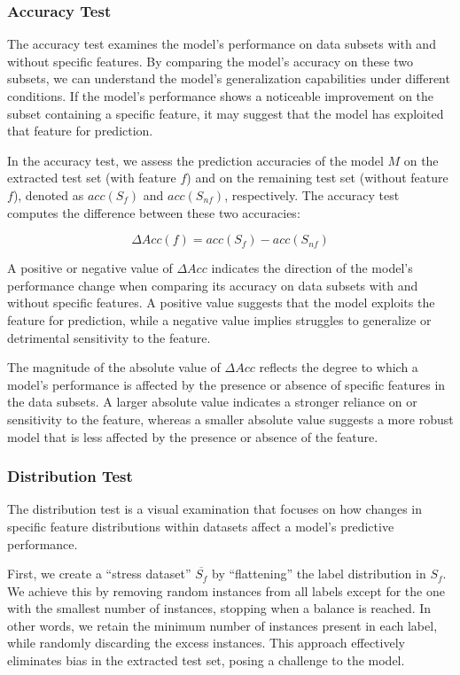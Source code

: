 \subsubsection{Accuracy Test}
\label{sec:accuracytest}
The accuracy test examines the model's performance on data 
subsets with and without specific features. 
By comparing the model's accuracy on these two subsets, 
we can understand the model's generalization 
capabilities under different conditions. 
If the model's performance shows a noticeable improvement 
on the subset containing a specific feature, 
it may suggest that the model has exploited that feature for prediction.

In the accuracy test, we assess the prediction accuracies 
of the model $M$ on the extracted test set (with feature $f$) 
and on the remaining test set (without feature $f$), 
denoted as $acc(S_f)$ and $acc(S_{nf})$, respectively. 
The accuracy test computes the difference between these two accuracies:

\begin{equation}
\Delta Acc(f) = acc(S_f) - acc(S_{nf})
\end{equation}

A positive or negative value of 
$\Delta Acc$ indicates the direction of the model's performance 
change when comparing its accuracy on data subsets with 
and without specific features. A positive value 
suggests that the model exploits the feature for prediction, 
while a negative value implies struggles to 
generalize or detrimental sensitivity to the feature.

The magnitude of the absolute value of $\Delta Acc$ 
reflects the degree to which a model's performance 
is affected by the presence or absence 
of specific features in the data subsets. 
A larger absolute value indicates a 
stronger reliance on or sensitivity to the feature, 
whereas a smaller absolute value suggests a more 
robust model that is less affected by 
the presence or absence of the feature.


\subsubsection{Distribution Test}
\label{sec:distributiontest}
The distribution test is a visual examination that focuses 
on how changes in specific feature distributions 
within datasets affect a model's predictive performance.

First, we create a ``stress dataset'' $\overline{S_f}$ by 
``flattening'' the label distribution in $S_f$. 
We achieve this by removing random instances from all 
labels except for the one with the smallest number of instances, 
stopping when a balance is reached. In other words, 
we retain the minimum number of instances present in each label, 
while randomly discarding the excess instances. 
This approach effectively eliminates bias in the extracted test set, posing a challenge to the model.

